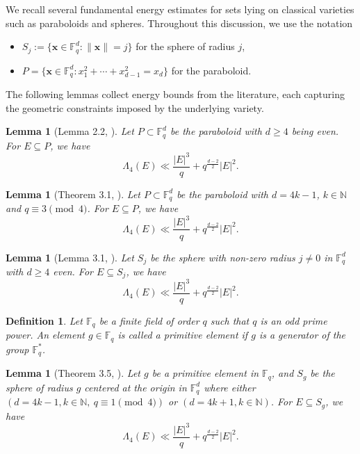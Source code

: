 \documentclass[11pt]{article}
\newtheorem{definition}[theorem]{Definition}
\newtheorem{lemma}[theorem]{Lemma}
\begin{document}
We recall several fundamental energy estimates for sets lying on classical varieties such as paraboloids and spheres.  Throughout this discussion, we use the notation

\begin{itemize}
\item $S_j := \{\mathbf{x} \in \mathbb{F}_q^d : \|\mathbf{x}\| = j\}$ for the sphere of radius $j$,
\item $P = \{\mathbf{x} \in \mathbb{F}_q^d : x_1^2 + \cdots + x_{d-1}^2 = x_d\}$ for the paraboloid.
\end{itemize}

The following lemmas collect  energy bounds from the literature, each capturing the geometric constraints imposed by the underlying variety.

\begin{lemma}[Lemma 2.2, \cite{IKL2020}]\label{lemma21}
Let $P \subset \mathbb{F}_q^d$ be the paraboloid with $d \geq 4$ being even. For $E \subseteq P$, we have
\[
\Lambda_4(E)\ll \frac{|E|^3}{q} + q^{\frac{d-2}{2}}|E|^2.
\]
\end{lemma}

\begin{lemma}[Theorem 3.1, \cite{KPV2021}]\label{lemma2.1}
Let $P \subset \mathbb{F}_q^d$ be the paraboloid with $d = 4k-1$, $k \in \mathbb{N}$ and $q \equiv 3 \pmod{4}$. For $E \subseteq P$,  we have
\[
\Lambda_4(E) \ll \frac{|E|^3}{q} + q^{\frac{d-2}{2}}|E|^2.
\]
\end{lemma}

\begin{lemma}[Lemma 3.1, \cite{IKLPS2021}]\label{lemma0}
Let $S_j$ be the sphere with non-zero radius $j \neq 0$ in $\mathbb{F}_q^d$ with $d \geq 4$ even. For $E \subseteq S_j$,  we have
\[
\Lambda_4(E) \ll \frac{|E|^3}{q} + q^{\frac{d-2}{2}}|E|^2.
\]
\end{lemma}


\begin{definition}
Let $\mathbb{F}_q$ be a finite field of order $q$ such that $q$ is an odd prime power. An element $g \in \mathbb{F}_q$ is called a \emph{primitive element} if $g$ is a generator of the group $\mathbb{F}_q^*$.
\end{definition}



\begin{lemma}[Theorem 3.5, \cite{KPV2021}]\label{lemma2.5}
Let $g$ be a primitive element in $\mathbb{F}_q$, and $S_g$ be the sphere of radius $g$ centered at the origin in $\mathbb{F}_q^d$ where
either $(d = 4k - 1, k\in \mathbb{N}, ~q \equiv 1 \pmod{4})$ or $(d = 4k + 1, k\in \mathbb{N})$. For $E \subseteq S_g$, we have
\begin{equation}\label{ene-e}
\Lambda_4(E) \ll \frac{|E|^3}{q} + q^{\frac{d-2}{2}}|E|^2.
\end{equation}
\end{lemma}
\end{document}
